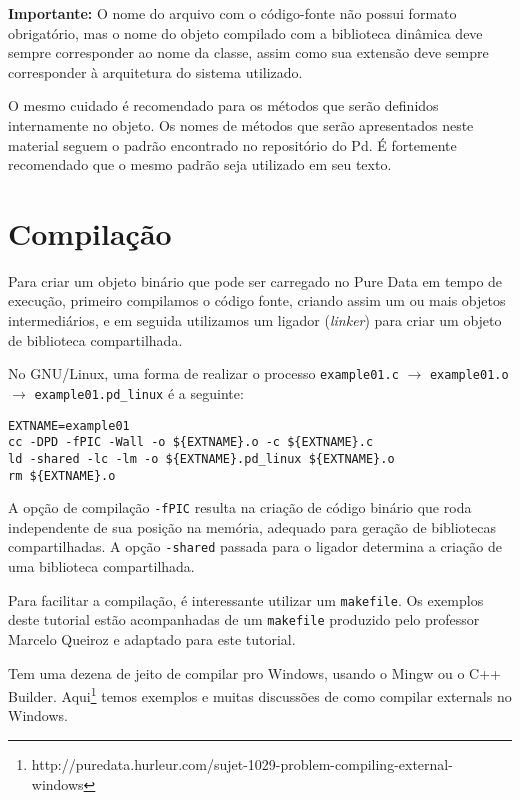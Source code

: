 \textbf{Importante:} O nome do arquivo com o código-fonte não possui formato
obrigatório, mas o nome do objeto compilado com a biblioteca dinâmica deve
sempre corresponder ao nome da classe, assim como sua extensão deve sempre
corresponder à arquitetura do sistema utilizado.

O mesmo cuidado é recomendado para os métodos que serão definidos internamente
no objeto. Os nomes de métodos que serão apresentados neste material seguem o padrão
encontrado no repositório do Pd. É fortemente recomendado que o mesmo padrão seja
utilizado em seu texto.

\section{Compilação}
\label{sec:compiling}

Para criar um objeto binário que pode ser carregado no Pure Data em tempo de
execução, primeiro compilamos o código fonte, criando assim um ou mais objetos
intermediários, e em seguida utilizamos um ligador (\emph{linker}) para criar
um objeto de biblioteca compartilhada.

No GNU/Linux, uma forma de realizar o processo
\texttt{example01.c} $\rightarrow$ \texttt{example01.o} $\rightarrow$
\texttt{example01.pd\_linux} é a seguinte:

\vspace{1em}
\begin{lstlisting}
EXTNAME=example01
cc -DPD -fPIC -Wall -o ${EXTNAME}.o -c ${EXTNAME}.c
ld -shared -lc -lm -o ${EXTNAME}.pd_linux ${EXTNAME}.o
rm ${EXTNAME}.o
\end{lstlisting}

A opção de compilação \texttt{-fPIC} resulta na criação de código binário que
roda independente de sua posição na memória, adequado para geração de
bibliotecas compartilhadas. A opção \texttt{-shared} passada para o ligador
determina a criação de uma biblioteca compartilhada.

Para facilitar a compilação, é interessante utilizar um \texttt{makefile}. Os
exemplos deste tutorial estão acompanhadas de um \texttt{makefile} produzido
pelo professor Marcelo Queiroz e adaptado para este tutorial.

Tem uma dezena de jeito de compilar pro Windows, usando o Mingw ou o C++ Builder.
Aqui\footnote{http://puredata.hurleur.com/sujet-1029-problem-compiling-external-windows}
 temos exemplos e muitas discussões de como compilar externals no Windows.

